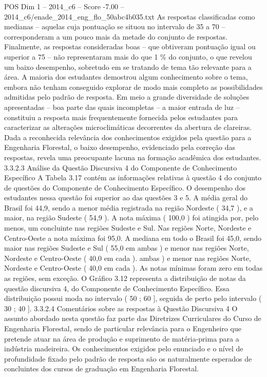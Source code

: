 \begin{textsample}{POS Dim 1 – 2014\_c6 – Score -7.00 – 2014\_c6/enade\_2014\_eng\_flo\_50abc4b035.txt}
As respostas classificadas como medianas – aquelas cuja pontuação se situou no intervalo de 35 a 70 – corresponderam a um pouco mais da metade do conjunto de respostas.
Finalmente, as respostas consideradas boas – que obtiveram pontuação igual ou superior a 75 – não representaram mais do que 1 \% do conjunto, o que revelou um baixo desempenho, sobretudo em se tratando de tema tão relevante para a área.
A maioria dos estudantes demostrou algum conhecimento sobre o tema, embora não tenham conseguido explorar de modo mais completo as possibilidades admitidas pelo padrão de resposta.
Em meio a grande diversidade de soluções apresentadas – boa parte das quais incompletas – a maior entrada de luz – constituiu a resposta mais frequentemente fornecida pelos estudantes para caracterizar as alterações microclimáticas decorrentes da abertura de clareiras.
Dada a reconhecida relevância dos conhecimentos exigidos pela questão para a Engenharia Florestal, o baixo desempenho, evidenciado pela correção das respostas, revela uma preocupante lacuna na formação acadêmica dos estudantes. 3.3.2.3 Análise da Questão Discursiva 4 do Componente de Conhecimento Específico A Tabela 3.17 contém as informações relativas à questão 4 do conjunto de questões do Componente de Conhecimento Específico.
O desempenho dos estudantes nessa questão foi superior ao das questões 3 e 5.
A média geral do Brasil foi 44,9, sendo a menor média registrada na região Nordeste ( 34,7 ), e a maior, na região Sudeste ( 54,9 ).
A nota máxima ( 100,0 ) foi atingida por, pelo menos, um concluinte nas regiões Sudeste e Sul.
Nas regiões Norte, Nordeste e Centro-Oeste a nota máxima foi 95,0.
A mediana em todo o Brasil foi 45,0, sendo maior nas regiões Sudeste e Sul ( 55,0 em ambas ) e menor nas regiões Norte, Nordeste e Centro-Oeste ( 40,0 em cada ). ambas ) e menor nas regiões Norte, Nordeste e Centro-Oeste ( 40,0 em cada ).
As notas mínimas foram zero em todas as regiões, sem exceção.
O Gráfico 3.12 representa a distribuição de notas da questão discursiva 4, do Componente de Conhecimento Específico.
Essa distribuição possui moda no intervalo ( 50 ; 60 ], seguida de perto pelo intervalo ( 30 ; 40 ]. 3.3.2.4 Comentários sobre as respostas à Questão Discursiva 4 O assunto abordado nesta questão faz parte das Diretrizes Curriculares do Curso de Engenharia Florestal, sendo de particular relevância para o Engenheiro que pretende atuar na área de produção e suprimento de matéria-prima para a indústria madeireira.
Os conhecimentos exigidos pelo enunciado e o nível de profundidade fixado pelo padrão de resposta são os naturalmente esperados de concluintes dos cursos de graduação em Engenharia Florestal.

\end{textsample}
